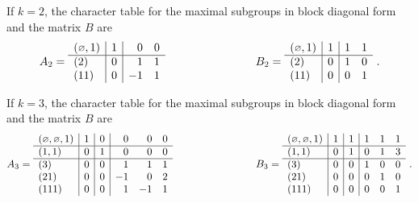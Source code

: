 \documentclass[ALCO,Unicode]{cedram}
\newcommand{\epart}{\text{\footnotesize$\varnothing$}}
\begin{document}
\begin{example} \label{Ex:firstfactorization}
If $k = 2$, the character table for the maximal
subgroups in block diagonal form and the matrix
$B$ are
$$
A_2 = \begin{array}{l|r|rr}
(\epart,1) & 1 & 0 & 0\\
\hline
(2) & 0 & 1 & 1\\
(11) & 0 & -1 & 1
\end{array}
\qquad\qquad\qquad\qquad
B_2 = \begin{array}{l|r|rr}
(\epart,1) & 1 & 1 & 1\\
\hline
(2) & 0 & 1 & 0\\
(11) & 0 & 0 & 1
\end{array}~.
$$

If $k = 3$, the character table for the maximal
subgroups in block diagonal form and the matrix
$B$ are
$$
A_3 = \begin{array}{l|r|r|rrr}
(\epart, \epart, 1) & 1 & 0 & 0 & 0 & 0\\
\hline
(1, 1) & 0 & 1 & 0 & 0 & 0\\
\hline
(3) & 0 & 0 & 1 & 1 & 1\\
(21) & 0 & 0 & -1 & 0 & 2\\
(111) & 0 & 0 & 1 & -1 & 1
\end{array}
\qquad\qquad\qquad\qquad
B_3 = \begin{array}{l|r|r|rrr}
(\epart, \epart, 1) & 1 & 1 & 1 & 1 & 1\\
\hline
(1, 1) & 0 & 1 & 0 & 1 & 3\\
\hline
(3) & 0 & 0 & 1 & 0 & 0\\
(21) & 0 & 0 & 0 & 1 & 0\\
(111) & 0 & 0 & 0 & 0 & 1
\end{array}~.
$$


\end{example}
\end{document}
